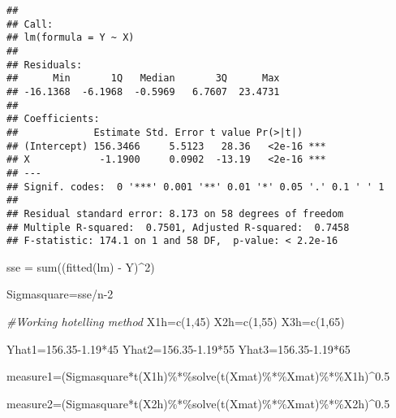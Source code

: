 \documentclass[
]{article}
\newenvironment{Shaded}{\begin{snugshade}}{\end{snugshade}}
\newcommand{\CommentTok}[1]{\textcolor[rgb]{0.56,0.35,0.01}{\textit{#1}}}
\newcommand{\DecValTok}[1]{\textcolor[rgb]{0.00,0.00,0.81}{#1}}
\newcommand{\FloatTok}[1]{\textcolor[rgb]{0.00,0.00,0.81}{#1}}
\newcommand{\FunctionTok}[1]{\textcolor[rgb]{0.00,0.00,0.00}{#1}}
\newcommand{\NormalTok}[1]{#1}
\newcommand{\OtherTok}[1]{\textcolor[rgb]{0.56,0.35,0.01}{#1}}
\newcommand{\SpecialCharTok}[1]{\textcolor[rgb]{0.00,0.00,0.00}{#1}}
\begin{document}
\begin{verbatim}
## 
## Call:
## lm(formula = Y ~ X)
## 
## Residuals:
##      Min       1Q   Median       3Q      Max 
## -16.1368  -6.1968  -0.5969   6.7607  23.4731 
## 
## Coefficients:
##             Estimate Std. Error t value Pr(>|t|)    
## (Intercept) 156.3466     5.5123   28.36   <2e-16 ***
## X            -1.1900     0.0902  -13.19   <2e-16 ***
## ---
## Signif. codes:  0 '***' 0.001 '**' 0.01 '*' 0.05 '.' 0.1 ' ' 1
## 
## Residual standard error: 8.173 on 58 degrees of freedom
## Multiple R-squared:  0.7501, Adjusted R-squared:  0.7458 
## F-statistic: 174.1 on 1 and 58 DF,  p-value: < 2.2e-16
\end{verbatim}

\begin{Shaded}
\begin{Highlighting}[]
\NormalTok{sse }\OtherTok{=} \FunctionTok{sum}\NormalTok{((}\FunctionTok{fitted}\NormalTok{(lm) }\SpecialCharTok{{-}}\NormalTok{ Y)}\SpecialCharTok{\^{}}\DecValTok{2}\NormalTok{)}

\NormalTok{Sigmasquare}\OtherTok{=}\NormalTok{sse}\SpecialCharTok{/}\NormalTok{n}\DecValTok{{-}2}

\CommentTok{\#Working hotelling method}
\NormalTok{X1h}\OtherTok{=}\FunctionTok{c}\NormalTok{(}\DecValTok{1}\NormalTok{,}\DecValTok{45}\NormalTok{)}
\NormalTok{X2h}\OtherTok{=}\FunctionTok{c}\NormalTok{(}\DecValTok{1}\NormalTok{,}\DecValTok{55}\NormalTok{)}
\NormalTok{X3h}\OtherTok{=}\FunctionTok{c}\NormalTok{(}\DecValTok{1}\NormalTok{,}\DecValTok{65}\NormalTok{)}

\NormalTok{Yhat1}\OtherTok{=}\FloatTok{156.35{-}1.19}\SpecialCharTok{*}\DecValTok{45}
\NormalTok{Yhat2}\OtherTok{=}\FloatTok{156.35{-}1.19}\SpecialCharTok{*}\DecValTok{55}
\NormalTok{Yhat3}\OtherTok{=}\FloatTok{156.35{-}1.19}\SpecialCharTok{*}\DecValTok{65}

\NormalTok{measure1}\OtherTok{=}\NormalTok{(Sigmasquare}\SpecialCharTok{*}\FunctionTok{t}\NormalTok{(X1h)}\SpecialCharTok{\%*\%}\FunctionTok{solve}\NormalTok{(}\FunctionTok{t}\NormalTok{(Xmat)}\SpecialCharTok{\%*\%}\NormalTok{Xmat)}\SpecialCharTok{\%*\%}\NormalTok{X1h)}\SpecialCharTok{\^{}}\FloatTok{0.5}

\NormalTok{measure2}\OtherTok{=}\NormalTok{(Sigmasquare}\SpecialCharTok{*}\FunctionTok{t}\NormalTok{(X2h)}\SpecialCharTok{\%*\%}\FunctionTok{solve}\NormalTok{(}\FunctionTok{t}\NormalTok{(Xmat)}\SpecialCharTok{\%*\%}\NormalTok{Xmat)}\SpecialCharTok{\%*\%}\NormalTok{X2h)}\SpecialCharTok{\^{}}\FloatTok{0.5}


\end{Highlighting}
\end{Shaded}
\end{document}
